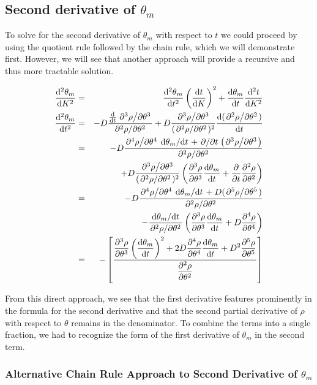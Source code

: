 \documentclass[11pt]{article} %
\begin{document}
\subsection{Second derivative of $ \theta_m $}

To solve for the second derivative of $ \theta_m $ with respect to $ t $ we could proceed by using the quotient rule followed by the chain rule, which we will demonstrate first. However, we will see that another approach will provide a recursive and thus more tractable solution.

\begin{eqnarray}
\dv[2]{\theta_m}{K} & = & \dv[2]{\theta_m}{t} \left( \dv{t}{K} \right)^2 + \dv{\theta_m}{t} \dv[2]{t}{K} \\
\dv[2]{\theta_m}{t} & = & -D \frac{  \dv{}{t} \pdv*[3]{\rho}{\theta} }{ \pdv*[2]{\rho}{\theta} } +
D \frac{ \pdv*[3]{\rho}{\theta} }{ ( \pdv*[2]{\rho}{\theta})^2 } \dv{(\pdv*[2]{\rho}{\theta}) }{t} \\
 & = &  -D \frac{ \pdv*[4]{\rho}{\theta} \dv*{\theta_m}{t} + \pdv*{t}( \pdv*[3]{\rho}{\theta}) }{ \pdv*[2]{\rho}{\theta} }  \\
& & + D \frac{ \pdv*[3]{\rho}{\theta} }{ ( \pdv*[2]{\rho}{\theta})^2 } \left( \pdv[3]{\rho}{\theta}\dv{\theta_m}{t} + \pdv{t} \pdv[2]{\rho}{\theta} \right) \\
 & = &  -D \frac{ \pdv*[4]{\rho}{\theta} \dv*{\theta_m}{t} + D ( \pdv*[5]{\rho}{\theta}) }{ \pdv*[2]{\rho}{\theta} }  \\
& & - \frac{ \dv*{\theta_m}{t} }{ \pdv*[2]{\rho}{\theta} } \left( \pdv[3]{\rho}{\theta}\dv{\theta_m}{t} + D \pdv[4]{\rho}{\theta} \right) \\
& = & - \left[ \frac{\displaystyle
\pdv[3]{\rho}{\theta} \left( \dv{\theta_m}{t} \right)^2
+ 2D \pdv[4]{\rho}{\theta} \dv{\theta_m}{t}
+ D^2 \pdv[5]{\rho}{\theta}
}{ \displaystyle \pdv[2]{\rho}{\theta} } \right]
\end{eqnarray}

From this direct approach, we see that the first derivative features prominently in the formula for the second derivative and that the second partial derivative of $ \rho $ with respect to $ \theta $ remains in the denominator. To combine the terms into a single fraction, we had to recognize the form of the first derivative of $ \theta_m $ in the second term.

\subsubsection{Alternative Chain Rule Approach to Second Derivative of $ \theta_m $}
\end{document}
